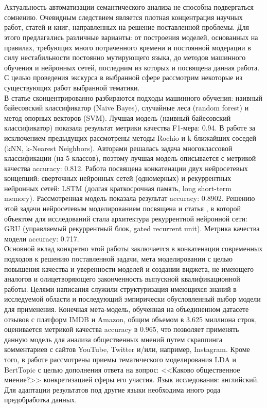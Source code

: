 \chapter{\introname}
Актуальность автоматизации семантического анализа 
не способна подвергаться сомнению. Очевидным следствием является
плотная концентрация научных работ, статей и книг, направленных на решение поставленной проблемы.
Для этого предлагались различные варианты: от построения моделей, основанных на правилах,
требующих много потраченного времени и постоянной модерации в силу нестабильности постоянно
мутирующего языка, до методов машинного обучения и нейронных сетей, последним из которых и посвящена
данная работа. С целью проведения экскурса в выбранной сфере рассмотрим некоторые из существующих работ выбранной тематики.\\
В статье \cite{Fang} сконцентрированно разбираются подходы машинного обучения:
наивный байесовский классификатор (Naive Bayes), случайные леса (random forest) и метод опорных векторов (SVM).
Лучшая модель (наивный байесовский классификатор) показала результат метрики качества F1-мера: 0.94.  %
В работе \cite{Kotelnikov:1} за исключением предыдущих рассмотрены методы Rochio и
k-ближайших соседей (kNN, k-Nearest Neighbors). Авторами решалась задача многоклассовой классификации (на 5 классов), поэтому лучшая модель описывается с метрикой качества accuracy: 0.812. 
Работа \cite{Ghorbani:1} посвящена конкатенации двух нейросетевых концепций: сверточных нейронных сетей (одномерных)
и рекуррентных нейронных сетей: LSTM (долгая краткосрочная память, long short-term memory). Рассмотренная модель показала результат accuracy: 0.8902. %
Решению этой задачи нейросетевым моделированием посвящена и статья \cite{Xing:1}, в которой объектом для исследований стала 
архитектура рекуррентной нейронной сети: GRU (управляемый рекуррентный блок, gated recurrent unit). Метрика качества модели accuracy: 0.717.\\ %
Основной вклад конкретно этой работы заключается в конкатенации современных подходов к решению поставленной задачи, 
мета моделировании с целью повышения качества и уверенности моделей и создании виджета, не имеющего аналогов и олицетворяющего
законченность выпускной квалификационной работы. Целями написания служили структуризация имеющихся знаний в исследуемой области 
и последующий эмпирически обусловленный выбор модели для применения. Конечная мета-модель, обученная на объединенном датасете отзывов
с платформ IMDB и Amazon, общим объемом в 3.625 миллиона строк, оценивается метрикой качества accuracy в 0.965, что позволяет применять данную модель
для анализа общественных мнений путем скраппинга комментариев с сайтов YouTube, Twitter и/или, например,  Instagram. Кроме того, в работе рассмотрены приемы тематического моделирования LDA и BertTopic с целью дополнения ответа на вопрос: <<Каково общественное мнение?>> конкретизацией сферы его участия. Язык исследования: английский. 
Для адаптации результатов под другие языки необходима иного рода предобработка данных.